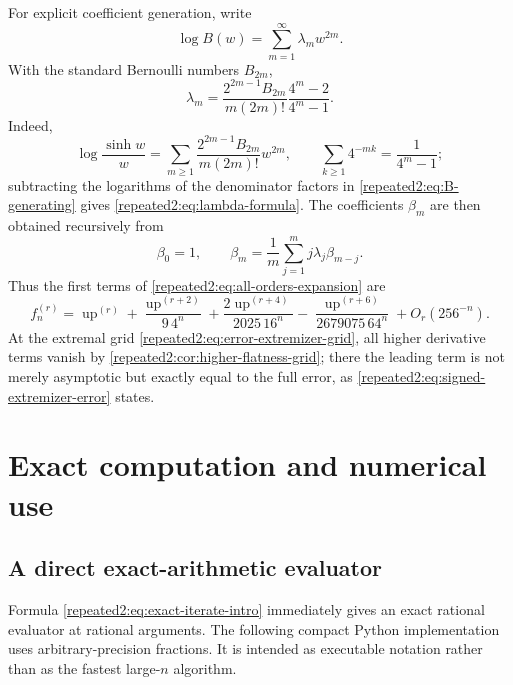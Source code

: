 \documentclass[11pt,oneside]{article}
\theoremstyle{definition}
\theoremstyle{remark}
\newcommand{\Up}{\operatorname{up}}
\begin{document}
For explicit coefficient generation, write
\begin{equation}
 \log B(w)=\sum_{m=1}^{\infty}\lambda_mw^{2m}.
 \label{repeated2:eq:lambda-log}
\end{equation}
With the standard Bernoulli numbers $B_{2m}$,
\begin{equation}
 \lambda_m=
 \frac{2^{2m-1}B_{2m}}{m(2m)!}
 \frac{4^m-2}{4^m-1}.
 \label{repeated2:eq:lambda-formula}
\end{equation}
Indeed,
\[
 \log\frac{\sinh w}{w}
 =\sum_{m\ge1}\frac{2^{2m-1}B_{2m}}{m(2m)!}w^{2m},
 \qquad
 \sum_{k\ge1}4^{-mk}=\frac1{4^m-1};
\]
subtracting the logarithms of the denominator factors in \eqref{repeated2:eq:B-generating} gives
\eqref{repeated2:eq:lambda-formula}.  The coefficients $\beta_m$ are then obtained recursively from
\begin{equation}
 \beta_0=1,
 \qquad
 \beta_m=\frac1m\sum_{j=1}^{m}j\lambda_j\beta_{m-j}.
 \label{repeated2:eq:beta-recurrence}
\end{equation}
Thus the first terms of \eqref{repeated2:eq:all-orders-expansion} are
\begin{equation}
 f_n^{(r)}=\Up^{(r)}
 +\frac{\Up^{(r+2)}}{9\,4^n}
 +\frac{2\Up^{(r+4)}}{2025\,16^n}
 -\frac{\Up^{(r+6)}}{2679075\,64^n}
 +O_r(256^{-n}).
 \label{repeated2:eq:first-asymptotic-terms}
\end{equation}
At the extremal grid \eqref{repeated2:eq:error-extremizer-grid}, all higher derivative terms vanish
by \cref{repeated2:cor:higher-flatness-grid}; there the leading term is not merely asymptotic but
exactly equal to the full error, as \eqref{repeated2:eq:signed-extremizer-error} states.

\section{Exact computation and numerical use}
\label{repeated2:sec:computation}

\subsection{A direct exact-arithmetic evaluator}

Formula \eqref{repeated2:eq:exact-iterate-intro} immediately gives an exact rational evaluator at
rational arguments.  The following compact Python implementation uses arbitrary-precision
fractions.  It is intended as executable notation rather than as the fastest large-$n$
algorithm.
\end{document}

